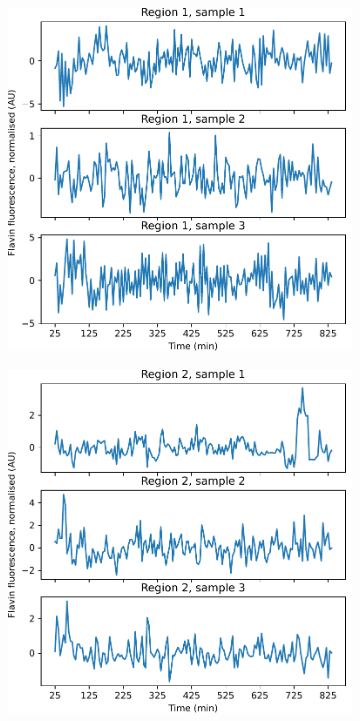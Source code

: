 \begin{figure}
  \centering
  \begin{subfigure}[t]{0.5\textwidth}
  \centering
    \includegraphics[width=\linewidth]{umap_single_is20016_bbox1.pdf}
    \caption{
    }
    \label{fig:umap-sample-bbox1}
  \end{subfigure}%
  \begin{subfigure}[t]{0.5\textwidth}
  \centering
    \includegraphics[width=\linewidth]{umap_single_is20016_bbox2.pdf}
    \caption{
    }
    \label{fig:umap-sample-bbox2}
  \end{subfigure}


\end{figure}

